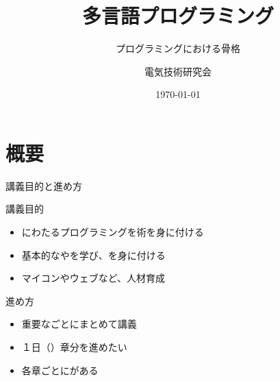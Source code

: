 \documentclass[dvipdfmx]{beamer}
\title{多言語プログラミング}
\subtitle{プログラミングにおける骨格}
\author[電研]{電気技術研究会}
\institute[NITNC]{NIT, Nara Collage}
\date[\today]{\today}
\begin{document}
\begin{frame}[plain]
  \titlepage
\end{frame}

\section*{概要}
  \begin{frame}
    \sectionpage
  \end{frame}
  \begin{frame}{講義目的と進め方}
    \begin{large}講義目的\end{large}
    \begin{itemize}
      \setlength{\itemsep}{5mm}
      \item {}にわたるプログラミングを術を身に付ける
      \item 基本的なやを学び、を身に付ける
      \item マイコンやウェブなど、人材育成
    \end{itemize}
    \vfill
    \begin{large}進め方\end{large}
    \begin{itemize}
      \setlength{\itemsep}{5mm}
      \item 重要なごとにまとめて講義
      \item １日（）章分を進めたい
      \item 各章ごとにがある
    \end{itemize}
  \end{frame}
\end{document}
